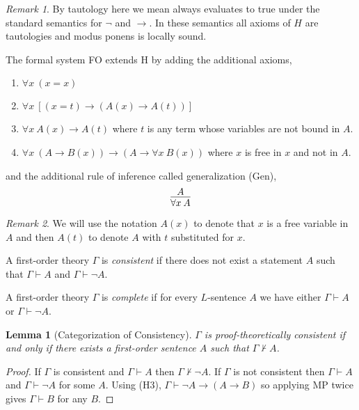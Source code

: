 \documentclass[12pt, leqno]{article}
\newcommand{\proves}{\vdash}
\newcommand{\uq}[1]{\forall{#1} \:}
\newenvironment{definition}[1][Definition:]{\begin{trivlist}
\item[\hskip \labelsep {\bfseries #1}]}{\end{trivlist}}
\theoremstyle{theorem}
\newtheorem{lemma}[theorem]{Lemma}
\theoremstyle{definition}
\theoremstyle{definition}
\theoremstyle{remark}
\theoremstyle{definition}
\theoremstyle{remark}
\newtheorem{remark}{Remark}[subsection]
\begin{document}
\begin{remark}
By tautology here we mean always evaluates to true under the standard semantics for $\neg$ and $\to$. In these semantics all axioms of $H$ are tautologies and modus ponens is locally sound. 
\end{remark}

\begin{definition}
The formal system FO extends H by adding the additional axioms,
\begin{enumerate}
\item[(EQ1)] $\uq{x} (x = x)$
\item[(EQ2)] $\uq{x} [(x = t) \to (A(x) \to A(t))]$
\item[(FO1)] $\uq{x} A(x) \to A(t)$ where $t$ is any term whose variables are not bound in $A$. 
\item[(FO2)] $\uq{x} (A \to B(x)) \to (A \to \uq{x} B(x))$ where $x$ is free in $x$ and not in $A$. 
\end{enumerate}
and the additional rule of inference called generalization (Gen),
\[ \infer{\uq{x} A}{A} \]
\end{definition}

\begin{remark}
We will use the notation $A(x)$ to denote that $x$ is a free variable in $A$ and then $A(t)$ to denote $A$ with $t$ substituted for $x$. 

\end{remark}

\begin{definition}
A first-order theory $\Gamma$ is \textit{consistent} if there does not exist a statement $A$ such that $\Gamma \proves A$ and $\Gamma \proves \neg A$. 
\end{definition}

\begin{definition}
A first-order theory $\Gamma$ is \textit{complete} if for every $L$-sentence $A$ we have either $\Gamma \proves A$ or $\Gamma \proves \neg A$. 
\end{definition}


\begin{lemma}[Categorization of Consistency]
$\Gamma$ is proof-theoretically consistent if and only if there exists a first-order sentence $A$ such that $\Gamma \not\proves A$. 
\end{lemma}

\begin{proof}
If $\Gamma$ is consistent and $\Gamma \proves A$ then $\Gamma \not\proves \neg A$. If $\Gamma$ is not consistent then $\Gamma \proves A$ and $\Gamma \proves \neg A$ for some $A$. Using (H3), $\Gamma \proves \neg A \to (A \to B)$ so applying MP twice gives $\Gamma \proves B$ for any $B$. 
\end{proof}
\end{document}
